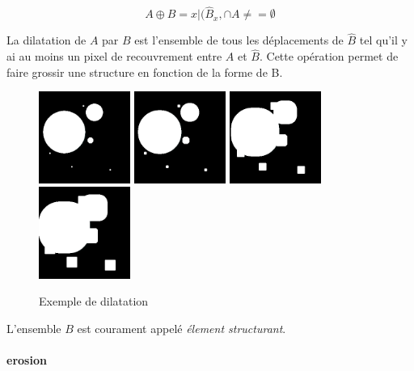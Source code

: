 \begin{equation}
 A \oplus B = {x|(\widehat{B}_x, \cap A \neq = \emptyset }
\end{equation}

La dilatation de $A$ par $B$ est l'ensemble de tous les déplacements de $\widehat{B}$ tel qu'il y ai au moins un pixel de recouvrement entre $A$ et $\widehat{B}$. Cette opération permet de faire grossir une structure en fonction de la forme de B.

\begin{figure}
  \centering
  \includegraphics[height=3cm]{Images/morpho_init.png}
  \includegraphics[height=3cm]{Images/morpho_dilate_k5.png}
  \includegraphics[height=3cm]{Images/morpho_dilate_k21.png}
  \includegraphics[height=3cm]{Images/morpho_dilate_k31.png}
  \label{fig:morpho_dilation}
  \caption{Exemple de dilatation}
\end{figure}

L'ensemble $B$ est courament appelé \emph{élement structurant}.

\paragraph{erosion}

